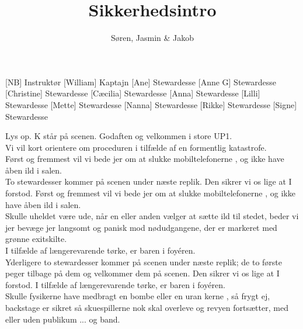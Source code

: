 \documentclass[a4paper,11pt]{article}
\title{Sikkerhedsintro}
\author{Søren, Jasmin \& Jakob}
\begin{document}
\maketitle

\begin{roles}
[NB] Instruktør
[William] Kaptajn
[Ane] Stewardesse
[Anne G] Stewardesse
[Christine] Stewardesse
[Cæcilia] Stewardesse
[Anna] Stewardesse
[Lilli] Stewardesse
[Mette] Stewardesse
[Nanna] Stewardesse
[Rikke] Stewardesse
[Signe] Stewardesse
\end{roles}


\begin{sketch}
\scene Lys op. K står på scenen.
 Godaften og velkommen i store UP1. \\
Vi vil kort orientere  om proceduren i tilfælde af en formentlig katastrofe.  \\
Først og fremmest vil vi bede jer om at slukke mobiltelefonerne , og ikke have åben ild i salen.  \\
\scene To stewardesser kommer på scenen under næste replik.
 Den sikrer vi os lige at I forstod.
 Først og fremmest vil vi bede jer om at slukke mobiltelefonerne , og ikke have åben ild i salen.  \\
Skulle uheldet være ude,  når en eller anden vælger at sætte ild til stedet,  beder vi jer bevæge jer langsomt og panisk mod nødudgangene,  der er markeret med grønne exitskilte. \\
I tilfælde af længerevarende tørke, er baren i foyéren.  \\
\scene Yderligere to stewardesser kommer på scenen under næste replik; de to første peger tilbage på dem og velkommer dem på scenen.
 Den sikrer vi os lige at I forstod.
 I tilfælde af længerevarende tørke, er baren i foyéren.  \\
Skulle fysikerne have medbragt en bombe  eller en uran kerne , så frygt ej, backstage er sikret  så skuespillerne nok skal overleve  og revyen fortsætter, med eller uden publikum ... og band.  \\

\end{sketch}
\end{document}

